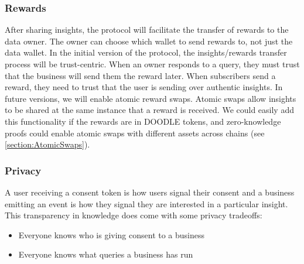\subsubsection{Rewards}
After sharing insights, the protocol will facilitate the transfer of rewards to the data owner. The owner can choose which wallet to send rewards to, not 
just the data wallet. In the initial version of the protocol, the insights/rewards transfer process will be trust-centric. When an owner responds to a 
query, they must trust that the business will send them the reward later. When subscribers send a reward, they need to trust that the user is sending 
over authentic insights. In future versions, we will enable atomic reward swaps. Atomic swaps allow insights to be shared at the same instance that a 
reward is received. We could easily add this functionality if the rewards are in DOODLE tokens, and zero-knowledge proofs could enable atomic swaps 
with different assets across chains (see \ref{section:AtomicSwaps}).

\subsubsection{Privacy}
A user receiving a consent token is how users signal their consent and a business emitting an event is how they signal they are interested in a particular 
insight. This transparency in knowledge does come with some privacy tradeoffs:
\begin{itemize}
  \item Everyone knows who is giving consent to a business
  \item Everyone knows what queries a business has run
\end{itemize}

